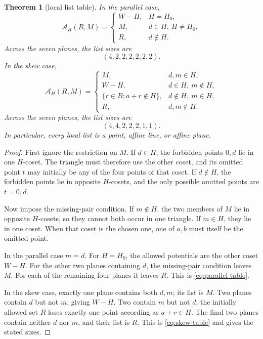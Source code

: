 \documentclass[11pt]{article}
\newtheorem{theorem}{Theorem}[section]
\theoremstyle{definition}
\theoremstyle{remark}
\newcommand{\A}{\mathcal A}
\numberwithin{equation}{section}
\begin{document}
\begin{theorem}[local list table]
\label{thm:local-table}
In the parallel case,
\begin{equation}
\A_H(R,M)=
\begin{cases}
W-H,&H=H_0,\\
M,&d\in H,\ H\ne H_0,\\
R,&d\notin H.
\end{cases}
\label{eq:parallel-table}
\end{equation}
Across the seven planes, the list sizes are
\[
                         (4,2,2,2,2,2,2).
\]
In the skew case,
\begin{equation}
\A_H(R,M)=
\begin{cases}
M,&d,m\in H,\\
W-H,&d\in H,\ m\notin H,\\
\{r\in R:a+r\notin H\},&d\notin H,\ m\in H,\\
R,&d,m\notin H.
\end{cases}
\label{eq:skew-table}
\end{equation}
Across the seven planes, the list sizes are
\[
                         (4,4,2,2,2,1,1).
\]
In particular, every local list is a point, affine line, or affine
plane.
\end{theorem}

\par\medskip
\begin{proof}
First ignore the restriction on \(M\).  If \(d\in H\), the forbidden
points \(0,d\) lie in one \(H\)-coset.  The triangle must therefore use
the other coset, and its omitted point \(t\) may initially be any of the
four points of that coset.  If \(d\notin H\), the forbidden points lie in
opposite \(H\)-cosets, and the only possible omitted points are
\(t=0,d\).

Now impose the missing-pair condition.  If \(m\notin H\), the two members
of \(M\) lie in opposite \(H\)-cosets, so they cannot both occur in one
triangle.  If \(m\in H\), they lie in one coset.  When that coset is the
chosen one, one of \(a,b\) must itself be the omitted point.

In the parallel case \(m=d\).  For \(H=H_0\), the allowed potentials are
the other coset \(W-H\).  For the other two planes containing \(d\), the
missing-pair condition leaves \(M\).  For each of the remaining four
planes it leaves \(R\).  This is \eqref{eq:parallel-table}.

In the skew case, exactly one plane contains both \(d,m\); its list is
\(M\).  Two planes contain \(d\) but not \(m\), giving \(W-H\).  Two
contain \(m\) but not \(d\); the initially allowed set \(R\) loses exactly
one point according as \(a+r\in H\).  The final two planes contain
neither \(d\) nor \(m\), and their list is \(R\).  This is
\eqref{eq:skew-table} and gives the stated sizes.
\end{proof}
\end{document}

